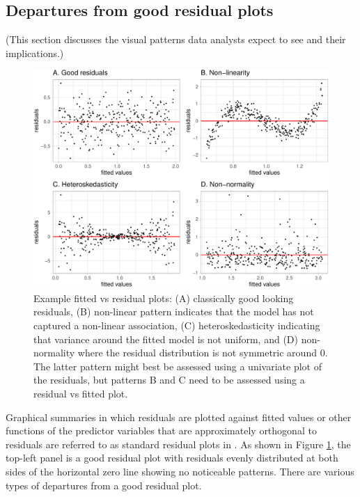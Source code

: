 \documentclass[]{interact}
\theoremstyle{plain}%
\theoremstyle{definition}
\theoremstyle{remark}
\begin{document}
\hypertarget{departures-from-good-residual-plots}{%
\subsection{Departures from good residual
plots}\label{departures-from-good-residual-plots}}

(This section discusses the visual patterns data analysts expect to see
and their implications.)

\begin{figure}

{\centering \includegraphics[width=1\linewidth]{paper_comparison_files/figure-latex/residual-plot-common-departures-1} 

}

\caption{Example fitted vs residual plots: (A) classically good looking residuals, (B) non-linear pattern indicates that the model has not captured a non-linear association, (C) heteroskedasticity indicating that variance around the fitted model is not uniform, and (D) non-normality where the residual distribution is not symmetric around 0. The latter pattern might best be assessed using a univariate plot of the residuals, but patterns B and C need to be assessed using a residual vs fitted plot.}\label{fig:residual-plot-common-departures}
\end{figure}

Graphical summaries in which residuals are plotted against fitted values
or other functions of the predictor variables that are approximately
orthogonal to residuals are referred to as standard residual plots in
\citet{cook1982residuals}. As shown in Figure
\ref{fig:residual-plot-common-departures}, the top-left panel is a good
residual plot with residuals evenly distributed at both sides of the
horizontal zero line showing no noticeable patterns. There are various
types of departures from a good residual plot.
\end{document}
